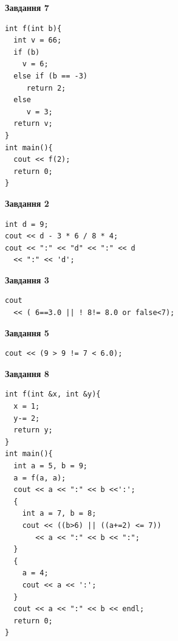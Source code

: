 \documentclass[12pt, ukrainian]{article}
\begin{document}
{\begin {large}
\begin{minipage}[t]{7.0cm}
\begin{center}
\textbf{Завдання 7}
\end{center}
\vspace{-8mm}

\begin{verbatim}
int f(int b){
  int v = 66;
  if (b)
    v = 6;
  else if (b == -3)
     return 2;
  else
     v = 3;
  return v;
}
int main(){
  cout << f(2);
  return 0;
}
\end{verbatim}

\end{minipage}
\vline \hspace{1mm}
\begin{minipage}[t]{11.0cm}

\begin{center}
\textbf{Завдання 2}
\end{center}
\vspace{-8mm}

\begin{verbatim}
int d = 9;
cout << d - 3 * 6 / 8 * 4;
cout << ":" << "d" << ":" << d 
  << ":" << 'd';
\end{verbatim}



\begin{center}
\textbf{Завдання 3}
\end{center}
\vspace{-8mm}

\begin{verbatim}
cout 
  << ( 6==3.0 || ! 8!= 8.0 or false<7);
\end{verbatim}



\begin{center}
\textbf{Завдання 5}
\end{center}
\vspace{-8mm}

\begin{verbatim}
cout << (9 > 9 != 7 < 6.0);
\end{verbatim}



\begin{center}
\textbf{Завдання 8}
\end{center}
\vspace{-8mm}

\begin{verbatim}
int f(int &x, int &y){
  x = 1;
  y-= 2;
  return y;
}
int main(){
  int a = 5, b = 9;
  a = f(a, a);
  cout << a << ":" << b <<':';
  {
    int a = 7, b = 8;
    cout << ((b>6) || ((a+=2) <= 7))
       << a << ":" << b << ":";
  }
  {
    a = 4;
    cout << a << ':';
  }
  cout << a << ":" << b << endl;
  return 0;
}
\end{verbatim}


\end{minipage}
\end{large}}
\end{document}
